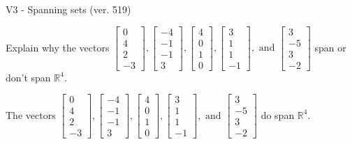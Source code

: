 \begin{exercise}
  \begin{exerciseTitle}V3 - Spanning sets (ver. 519)\end{exerciseTitle}
  \begin{exerciseStatement}
    Explain why the vectors \(\left[\begin{array}{r}
0 \\
4 \\
2 \\
-3
\end{array}\right] , \left[\begin{array}{r}
-4 \\
-1 \\
-1 \\
3
\end{array}\right] , \left[\begin{array}{r}
4 \\
0 \\
1 \\
0
\end{array}\right] , \left[\begin{array}{r}
3 \\
1 \\
1 \\
-1
\end{array}\right] , \text{ and } \left[\begin{array}{r}
3 \\
-5 \\
3 \\
-2
\end{array}\right]\) span or don't span \(\mathbb{R}^4\). 
	


  \end{exerciseStatement}
  \begin{exerciseAnswer}
   The vectors \(\left[\begin{array}{r}
0 \\
4 \\
2 \\
-3
\end{array}\right] , \left[\begin{array}{r}
-4 \\
-1 \\
-1 \\
3
\end{array}\right] , \left[\begin{array}{r}
4 \\
0 \\
1 \\
0
\end{array}\right] , \left[\begin{array}{r}
3 \\
1 \\
1 \\
-1
\end{array}\right] , \text{ and } \left[\begin{array}{r}
3 \\
-5 \\
3 \\
-2
\end{array}\right]\) 
  	 do  
	span \(\mathbb{R}^4\).
  


  \end{exerciseAnswer}
\end{exercise}
